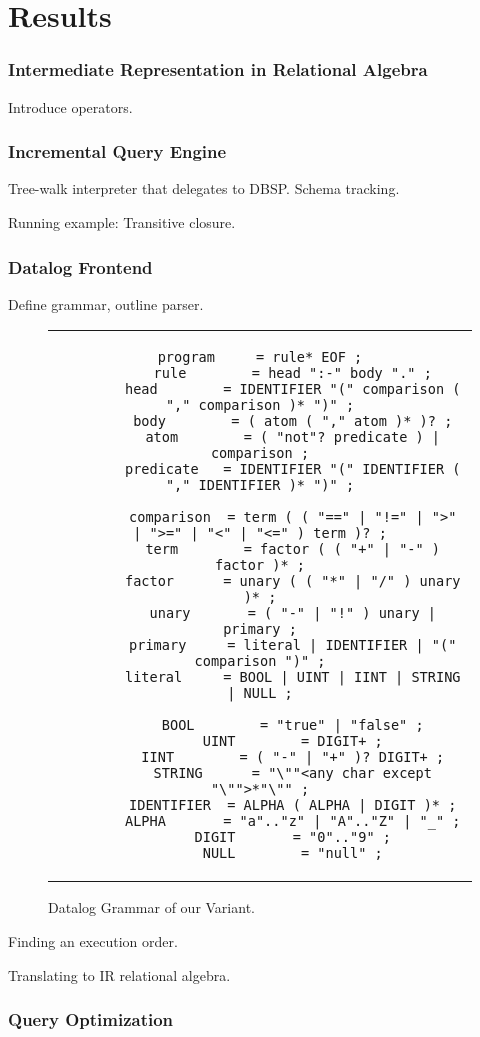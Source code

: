 
\chapter{Results}\label{ch:results}

\subsection{Intermediate Representation in Relational Algebra}

Introduce operators.

\subsection{Incremental Query Engine}

Tree-walk interpreter that delegates to DBSP. Schema tracking.

Running example: Transitive closure.

\subsection{Datalog Frontend}

Define grammar, outline parser.

\begin{figure}[htpb]
	\centering
	\begin{tabular}{c}
		\begin{lstlisting}[language=EBNF]
		program     = rule* EOF ;
		rule        = head ":-" body "." ;
		head        = IDENTIFIER "(" comparison ( "," comparison )* ")" ;
		body        = ( atom ( "," atom )* )? ;
		atom        = ( "not"? predicate ) | comparison ;
		predicate   = IDENTIFIER "(" IDENTIFIER ( "," IDENTIFIER )* ")" ;

		comparison  = term ( ( "==" | "!=" | ">" | ">=" | "<" | "<=" ) term )? ;
		term        = factor ( ( "+" | "-" ) factor )* ;
		factor      = unary ( ( "*" | "/" ) unary )* ;
		unary       = ( "-" | "!" ) unary | primary ;
		primary     = literal | IDENTIFIER | "(" comparison ")" ;
		literal     = BOOL | UINT | IINT | STRING | NULL ;

		BOOL        = "true" | "false" ;
		UINT        = DIGIT+ ;
		IINT        = ( "-" | "+" )? DIGIT+ ;
		STRING      = "\""<any char except "\"">*"\"" ;
		IDENTIFIER  = ALPHA ( ALPHA | DIGIT )* ;
		ALPHA       = "a".."z" | "A".."Z" | "_" ;
		DIGIT       = "0".."9" ;
		NULL        = "null" ;
        \end{lstlisting}
	\end{tabular}
	\caption[Example listing]{Datalog Grammar of our Variant.}\label{code:datalog-grammar}
\end{figure}

Finding an execution order.

Translating to IR relational algebra.

\subsection{Query Optimization}
